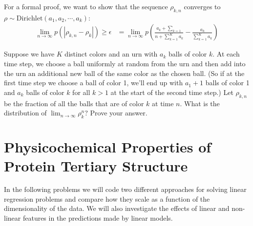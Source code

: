 \documentclass[submit]{harvardml}
\theoremstyle{plain}
\begin{document}
\begin{enumerate}[label=(\alph*)]
For a formal proof, we want to show that the sequence $\rho_{k,n}$ converges to $\rho \sim \text{Dirichlet}(a_1,a_2,\cdots,a_k)$:
\begin{align*}
\lim_{n \to \infty} p(|\rho_{k,n} - \rho_k|) \geq \epsilon &= \lim_{n \to \infty} p\left(\frac{a_k + \sum_{k=1}}{n + \sum_{k=1}^K a_k} - \frac{a_k}{\sum_{k=1}^K a_k} \right)
\end{align*}

Suppose we have $K$ distinct colors and an urn with $a_k$ balls of color $k$. At each time step, we choose a ball uniformly at random from the urn and then add into the urn an additional new ball of the same color as the chosen ball. (So if at the first time step we choose a ball of color 1, we'll end up with $a_1+1$ balls of color 1 and $a_k$ balls of color $k$ for all $k > 1$ at the start of the second time step.) Let $\rho_{k,n}$ be the fraction of all the balls that are of color $k$ at time $n$. What is the distribution of $\lim_{n \rightarrow \infty} \rho_k^n$? Prove your answer.
\end{enumerate}

\section*{Physicochemical Properties of Protein Tertiary Structure}

In the following problems we will code two different approaches for
solving linear regression problems and compare how they scale as a function of
the dimensionality of the data.  We will also investigate the effects of
linear and non-linear features in the predictions made by linear models.
\end{document}

